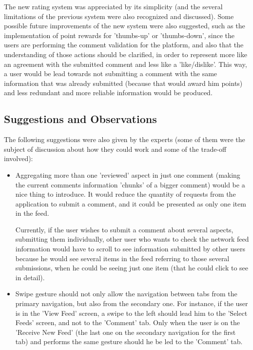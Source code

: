The new rating system was appreciated by its simplicity (and the several limitations of the previous system were also recognized and discussed). Some possible future improvements of the new system were also suggested, such as the implementation of point rewards for 'thumbs-up' or 'thumbs-down', since the users are performing the comment validation for the platform, and also that the understanding of those actions should be clarified, in order to represent more like an agreement with the submitted comment and less like a 'like/dislike'. This way, a user would be lead towards not submitting a comment with the same information that was already submitted (because that would award him points) and less redundant and more reliable information would be produced.

\subsection{Suggestions and Observations}

The following suggestions were also given by the experts (some of them were the subject of discussion about how they could work and some of the trade-off involved):

\begin{itemize}
\item Aggregating more than one 'reviewed' aspect in just one comment (making the current comments information 'chunks' of a bigger comment) would be a nice thing to introduce. It would reduce the quantity of requests from the application to submit a comment, and it could be presented as only one item in the feed. 

Currently, if the user wishes to submit a comment about several aspects, submitting them individually, other user who wants to check the network feed information would have to scroll to see information submitted by other users because he would see several items in the feed referring to those several submissions, when he could be seeing just one item (that he could click to see in detail).

\item Swipe gesture should not only allow the navigation between tabs from the primary navigation, but also from the secondary one. For instance, if the user is in the 'View Feed' screen, a swipe to the left should lead him to the 'Select Feeds' screen, and not to the 'Comment' tab. Only when the user is on the 'Receive New Feed' (the last one on the secondary navigation for the first tab) and performs the same gesture should he be led to the 'Comment' tab.
\end{itemize}

